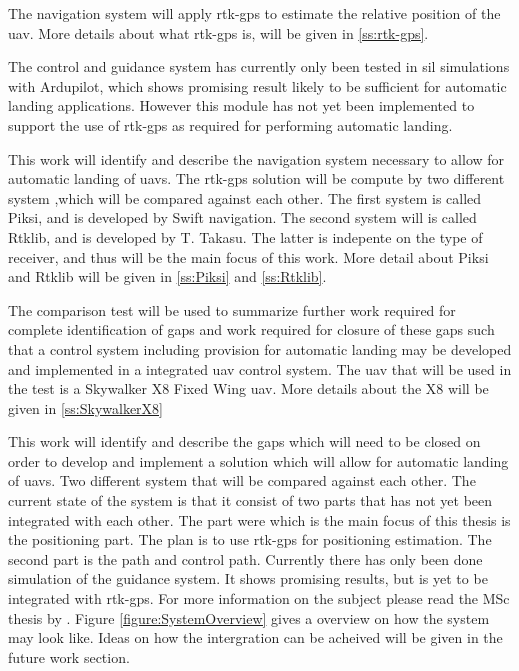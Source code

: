 The navigation system will apply \gls{rtk-gps} to estimate the relative position of the \gls{uav}. More details about what \gls{rtk-gps} is, will be given in \ref{ss:rtk-gps}.

The control and guidance system has currently only been tested in \gls{sil} simulations with Ardupilot, which shows promising result likely to be sufficient for automatic landing applications. However this module has not yet been implemented to support the use of \gls{rtk-gps} as required for performing automatic landing.

This work will identify and describe the navigation system necessary to allow for automatic landing of \glspl{uav}. The \gls{rtk-gps} solution will be compute by two different system ,which will be compared against each other. The first system is called Piksi, and is developed by Swift navigation. The second system will is called Rtklib, and is developed by T. Takasu. The latter is indepente on the type of receiver, and thus will be the main focus of this work. More detail about Piksi and Rtklib will be given in \ref{ss:Piksi} and \ref{ss:Rtklib}.

The comparison test will be used to summarize further work required for complete identification of gaps and work required for closure of these gaps such that a control system including provision for automatic landing may be developed and implemented in a integrated \gls{uav} control system. The \gls{uav} that will be used in the test is a Skywalker X8 Fixed Wing \gls{uav}. More details about the X8 will be given in \ref{ss:SkywalkerX8}


This work will identify and describe the gaps which will need to be closed on order to develop and implement a solution which will allow for automatic landing of \glspl{uav}. Two different system that will be compared against each other. 
The current state of the system is that it consist of two parts that has not yet been integrated with each other. The part were which is the main focus of this thesis is the positioning part. The plan is to use \gls{rtk-gps} for positioning estimation. The second part is the path and control path. Currently there has only been done simulation of the guidance system. It shows promising results, but is yet to be integrated with \gls{rtk-gps}. For more information on the subject please read the MSc thesis by \citep{Froelich}. Figure \ref{figure:SystemOverview} gives a overview on how the system may look like. Ideas on how the intergration can be acheived will be given in the future work section.

